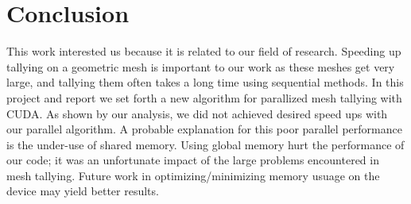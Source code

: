 \section{Conclusion}
This work interested us because it is related to our field of 
research. Speeding up tallying on a geometric mesh is important to our work 
as these meshes get very large, and tallying them often takes a long time
using sequential methods. In this project and report we set
forth a new algorithm for parallized mesh tallying with CUDA. 
As shown by our analysis, we did not achieved desired speed ups with our
parallel algorithm. 
A probable explanation for this poor parallel performance is the under-use of
shared memory. Using global memory hurt the performance of our code;
it was an unfortunate impact of the large problems encountered in mesh tallying.
Future work in optimizing/minimizing memory usuage on the device may yield
better results.
